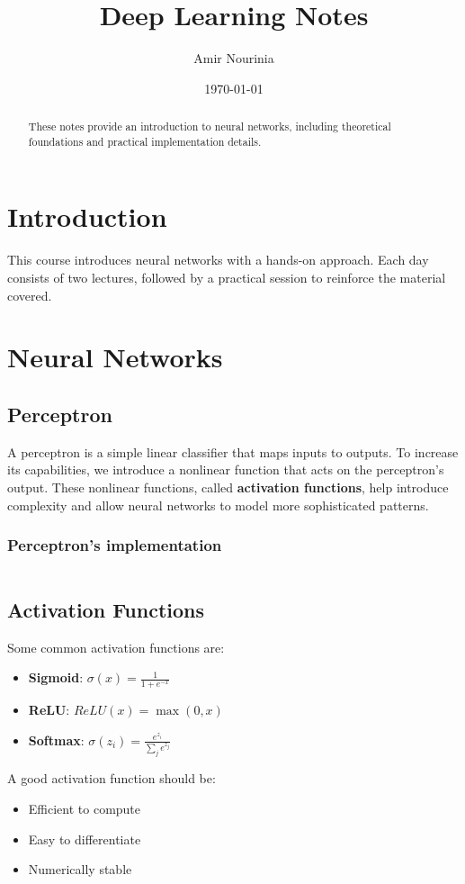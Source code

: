 \documentclass[a4paper,12pt]{article}
\title{\textbf{Deep Learning Notes}}
\author{Amir Nourinia}
\date{\today}
\begin{document}
\maketitle

\begin{abstract}
  These notes provide an introduction to neural networks, including theoretical foundations and practical implementation details.
\end{abstract}

\tableofcontents
\newpage

\section{Introduction}
This course introduces neural networks with a hands-on approach. Each day consists of two lectures,
followed by a practical session to reinforce the material covered.

\section{Neural Networks}

\subsection{Perceptron}
A perceptron is a simple linear classifier that maps inputs to outputs.
To increase its capabilities, we introduce a nonlinear function that acts on the perceptron's output.
These nonlinear functions, called \textbf{activation functions}, help introduce complexity and allow neural
networks to model more sophisticated patterns.
\subsubsection{Perceptron's implementation}
\inputminted[frame=lines, fontsize=\scriptsize, linenos]{python}{../../blue/layers/dense_layer.py}

\subsection{Activation Functions}
Some common activation functions are:
\begin{itemize}
  \item \textbf{Sigmoid}: $\sigma(x) = \frac{1}{1+e^{-x}}$
  \item \textbf{ReLU}: $ReLU(x) = \max(0, x)$
  \item \textbf{Softmax}: $\sigma(z_i) = \frac{e^{z_i}}{\sum_{j} e^{z_j}}$
\end{itemize}
A good activation function should be:
\begin{itemize}
  \item Efficient to compute
  \item Easy to differentiate
  \item Numerically stable
\end{itemize}
\end{document}
